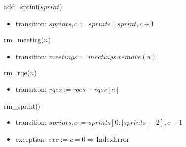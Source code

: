 \documentclass[12pt, titlepage]{article}
\begin{document}
\noindent add\_sprint($sprint$)
\begin{itemize}
    \item transition: $sprints, c := sprints\ ||\ sprint, c + 1$
\end{itemize}

\noindent rm\_meeting($n$)
\begin{itemize}
    \item transition: $meetings := meetings.remove(n)$
\end{itemize}

\noindent rm\_rqe($n$)
\begin{itemize}
    \item transition: $rqes := rqes - rqes[n]$
\end{itemize}

\noindent rm\_sprint()
\begin{itemize}
    \item transition: $sprints, c := sprints[0: |sprints| - 2], c - 1$
    \item exception: $exc := c = 0 \Rightarrow \text{IndexError}$
\end{itemize}
\end{document}
